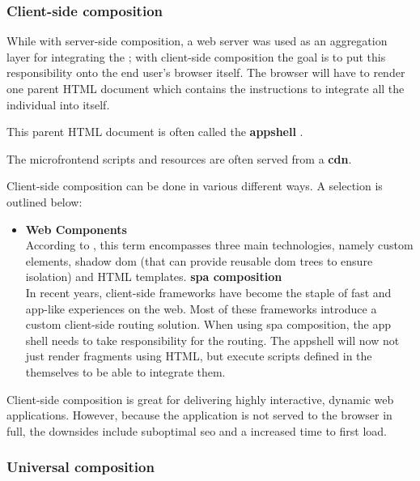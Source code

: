\subsubsection{Client-side composition}

While with server-side composition, a web server was used as an aggregation
layer for integrating the ; with client-side
composition the goal is to put this responsibility onto the end user's browser
itself. The browser will have to render one parent HTML document which contains
the instructions to integrate all the individual  into
itself.

This parent HTML document is often called the \textbf{\gls{appshell}}
\autocite{Geers_2020}\autocite{Rappl_2021}. 

The \gls{microfrontend} scripts and resources are often served from a
\textbf{\gls{cdn}}.

Client-side composition can be done in various different ways. A selection is
outlined below:
\begin{itemize}
  \item \textbf{Web Components}\\
  According to \textcite{Mozilla_WebComponents}, this term encompasses three
  main technologies, namely custom elements, shadow \gls{dom} (that can provide
  reusable \gls{dom} trees to ensure isolation) and HTML templates.
  \spacedItem \textbf{\gls{spa} composition}\\
  In recent years, client-side frameworks have become the staple of fast and
  app-like experiences on the web. Most of these frameworks introduce a custom
  client-side routing solution. When using \gls{spa} composition, the app shell
  needs to take responsibility for the routing. The \gls{appshell} will now not
  just render fragments using HTML, but execute scripts defined in the
   themselves to be able to integrate them.
\end{itemize}

Client-side composition is great for delivering highly interactive, dynamic web
applications. However, because the application is not served to the browser in
full, the downsides include suboptimal \gls{seo} and a increased time to first
load.

\subsubsection{Universal composition}
\label{sssec:universal-composition}

